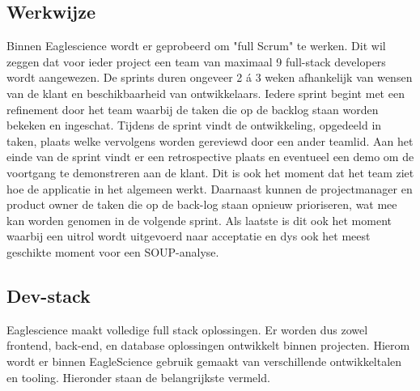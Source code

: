 \subsection{Werkwijze}\label{subsec:ESwerkwijze}
Binnen Eaglescience wordt er geprobeerd om "full Scrum" te werken. Dit wil zeggen dat voor ieder project een team van maximaal 9 full-stack developers wordt aangewezen. De sprints duren ongeveer 2 á 3 weken afhankelijk van wensen van de klant en beschikbaarheid van ontwikkelaars. Iedere sprint begint met een refinement door het team waarbij de taken die op de backlog staan worden bekeken en ingeschat. Tijdens de sprint vindt de ontwikkeling, opgedeeld in taken, plaats welke vervolgens worden gereviewd door een ander teamlid. Aan het einde van de sprint vindt er een retrospective plaats en eventueel een demo om de voortgang te demonstreren aan de klant. Dit is ook het moment dat het team ziet hoe de applicatie in het algemeen werkt. Daarnaast kunnen de projectmanager en product owner de taken die op de back-log staan opnieuw prioriseren, wat mee kan worden genomen in de volgende sprint. Als laatste is dit ook het moment waarbij een uitrol wordt uitgevoerd naar acceptatie en dys ook het meest geschikte moment voor een SOUP-analyse.


\subsection{Dev-stack}\label{subsec:ESdev-stack}
Eaglescience maakt volledige full stack oplossingen. Er worden dus zowel frontend, back-end, en database oplossingen ontwikkelt binnen projecten. Hierom wordt er binnen EagleScience gebruik gemaakt van verschillende ontwikkeltalen en tooling. Hieronder staan de belangrijkste vermeld.

